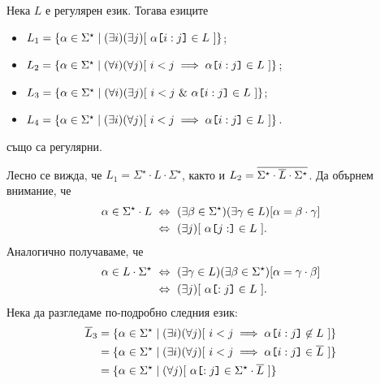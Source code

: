 \begin{extra}

  
\begin{problem}
  Нека $L$ е регулярен език. Тогава езиците
  \begin{itemize}
  \item
    $L_1 = \{ \alpha \in \Sigma^\star \mid (\exists i)(\exists j)[\ \alpha\texttt{[}{i:j}\texttt{]} \in L\ ]\}$;
  \item
    $L_2 = \{ \alpha \in \Sigma^\star \mid (\forall i)(\forall j)[\ i < j \implies \alpha\slice{i:j} \in L\ ]\}$;
  \item 
    $L_3 = \{ \alpha \in \Sigma^\star \mid (\forall i)(\exists j)[\ i < j\ \&\ \alpha\slice{i:j} \in L\ ]\}$;
  \item
    $L_4 = \{ \alpha \in \Sigma^\star \mid (\exists i)(\forall j)[\ i < j \implies \alpha\slice{i:j} \in L\ ]\}$.
  \end{itemize}
  също са регулярни.
\end{problem}
\ifhints
\begin{hint}
  Лесно се вижда, че $L_1 = \Sigma^\star \cdot L \cdot \Sigma^\star$, както и $L_2 = \overline{\Sigma^\star \cdot \overline{L} \cdot \Sigma^\star}$.
  Да обърнем внимание, че
  \begin{align*}
    \alpha \in \Sigma^\star \cdot L & \iff (\exists \beta \in \Sigma^\star)(\exists \gamma \in L)[ \alpha = \beta \cdot \gamma]\\
                                    & \iff (\exists j)[\ \alpha\slice{j:} \in L\ ].
  \end{align*}
  Аналогично получаваме, че
    \begin{align*}
      \alpha \in L\cdot \Sigma^\star & \iff (\exists \gamma \in L)(\exists \beta \in \Sigma^\star)[ \alpha = \gamma \cdot \beta ]\\
                                     & \iff (\exists j)[\ \alpha\slice{:j} \in L\ ].
  \end{align*}
  Нека да разгледаме по-подробно следния език:
  \begin{align*}
    \ov{L}_3 & = \{\alpha \in \Sigma^\star \mid (\exists i)(\forall j)[\ i < j \implies \alpha\slice{i:j} \not\in L\ ]\}\\
             & = \{\alpha \in \Sigma^\star \mid (\exists i)(\forall j)[\ i < j \implies \alpha\slice{i:j} \in \ov{L}\ ]\}\\
             & = \{\alpha \in \Sigma^\star \mid (\forall j)[\ \alpha\slice{:j} \in \Sigma^\star \cdot \ov{L}\ ]\}

\end{align*}
\end{hint}
\end{extra}
